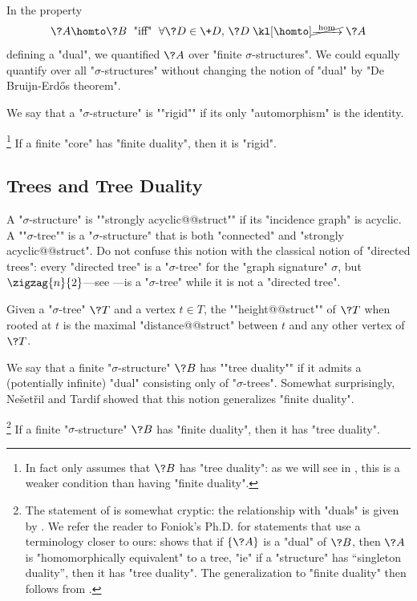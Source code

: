 \begin{remark}
	In the property
	\[
		\?A \homto \?B
		\;\text{ "iff" }\;
		\forall \?D \in \+D,\, \?D \nothomto \?A
	\]
	defining a "dual", we quantified $\?A$ over "finite $\sigma$-structures". 
	We could equally quantify over all "$\sigma$-structures" without changing the notion of "dual" by "De Bruijn-Erdős theorem".
\end{remark}

We say that a "$\sigma$-structure" is \AP""rigid"" if its only "automorphism"
is the identity.
\begin{proposition}
	\!\footnote{In fact
	only assumes that $\?B$ has "tree duality": as we will see in 
	, this is a weaker condition
	than having "finite duality".}%
	\label{prop:finite-duality-implies-rigid}
	If a finite "core" has "finite duality", then it is "rigid".
\end{proposition}

\subsection{Trees and Tree Duality}

A "$\sigma$-structure" is \AP""strongly acyclic@@struct"" if its "incidence graph" is acyclic.
A \AP""$\sigma$-tree"" is a "$\sigma$-structure" that is both "connected" and "strongly acyclic@@struct".
Do not confuse this notion with the classical notion of "directed trees":
every "directed tree" is a "$\sigma$-tree" for the "graph signature" $\sigma$,
but $\zigzag{n}{2}$---see ---is a "$\sigma$-tree"
while it is not a "directed tree". 

Given a "$\sigma$-tree" $\?T$ and a vertex $t\in T$, the \AP""height@@struct"" of $\?T$
when rooted at $t$ is the maximal "distance@@struct" between $t$ and any other vertex of $\?T$.

We say that a finite "$\sigma$-structure" $\?B$ has \AP""tree duality""
if it admits a (potentially infinite) "dual" consisting only of "$\sigma$-trees".
Somewhat surprisingly, Ne\v{s}et\v{r}il and Tardif showed that
this notion generalizes "finite duality".

\begin{proposition}
	\!\footnote{The statement of \cite[Theorem~3.1]{NesetrilTardif2000DualityTheorems}
	is somewhat cryptic: the relationship with "duals" is given by
	\cite[Lemma~2.5]{NesetrilTardif2000DualityTheorems}.
	We refer the reader to Foniok's Ph.D. for statements that use a terminology closer to ours:
	\cite[Theorem~2.1.12]{Foniok2007PhD} shows that if $\{\?A\}$ is a "dual" of $\?B$,
	then $\?A$ is "homomorphically equivalent" to a tree, "ie" if a "structure" has
	``singleton duality'', then it has "tree duality".
	The generalization to "finite duality" then follows from
	\cite[Theorem~2.4.4]{Foniok2007PhD}.}
	\AP\label{prop:finite-duality-implies-tree-duality}
	If a finite "$\sigma$-structure" $\?B$ has "finite duality",
	then it has "tree duality".
\end{proposition}

